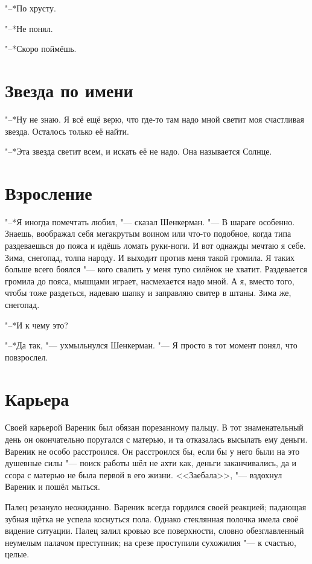 "--*По хрусту.

"--*Не понял.

"--*Скоро поймёшь.

\section{Звезда по имени}

"--*Ну не знаю.
Я всё ещё верю, что где-то там надо мной светит моя счастливая звезда.
Осталось только её найти.

"--*Эта звезда светит всем, и искать её не надо.
Она называется Солнце.

\section{Взросление}

"--*Я иногда помечтать любил, "--- сказал Шенкерман.
"--- В шараге особенно.
Знаешь, воображал себя мегакрутым воином или что-то подобное, когда типа раздеваешься до пояса и идёшь ломать руки-ноги.
И вот однажды мечтаю я себе.
Зима, снегопад, толпа народу.
И выходит против меня такой громила.
Я таких больше всего боялся "--- кого свалить у меня тупо силёнок не хватит.
Раздевается громила до пояса, мышцами играет, насмехается надо мной.
А я, вместо того, чтобы тоже раздеться, надеваю шапку и заправляю свитер в штаны.
Зима же, снегопад.

"--*И к чему это?

"--*Да так, "--- ухмыльнулся Шенкерман.
"--- Я просто в тот момент понял, что повзрослел.

\section{Карьера}

Своей карьерой Вареник был обязан порезанному пальцу.
В тот знаменательный день он окончательно поругался с матерью, и та отказалась высылать ему деньги.
Вареник не особо расстроился.
Он расстроился бы, если бы у него были на это душевные силы "--- поиск работы шёл не ахти как, деньги заканчивались, да и ссора с матерью не была первой в его жизни.
<<Заебала>>, "--- вздохнул Вареник и пошёл мыться.

Палец резануло неожиданно.
Вареник всегда гордился своей реакцией;
падающая зубная щётка не успела коснуться пола.
Однако стеклянная полочка имела своё видение ситуации.
Палец залил кровью все поверхности, словно обезглавленный неумелым палачом преступник;
на срезе проступили сухожилия "--- к счастью, целые.

